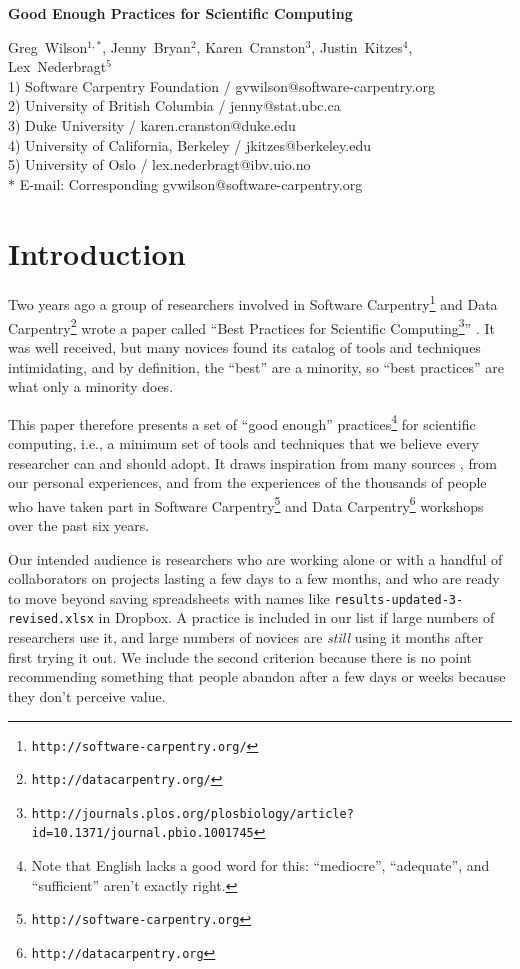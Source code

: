 \documentclass[10pt]{article}
\date{}
\newcommand{\withurl}[2]{{#1}\footnote{\texttt{#2}}}
\begin{document}
\begin{flushleft}
{\Large
\textbf{Good Enough Practices for Scientific Computing}
}

{Greg~Wilson}$^{1,\ast}$,
{Jenny~Bryan}$^{2}$,
{Karen~Cranston}$^{3}$,
{Justin~Kitzes}$^{4}$,
{Lex~Nederbragt}$^{5}$
\\
1) Software Carpentry Foundation / gvwilson@software-carpentry.org
\\
2) University of British Columbia / jenny@stat.ubc.ca
\\
3) Duke University / karen.cranston@duke.edu
\\
4) University of California, Berkeley / jkitzes@berkeley.edu
\\
5) University of Oslo / lex.nederbragt@ibv.uio.no
\\
$\ast$ E-mail: Corresponding gvwilson@software-carpentry.org
\end{flushleft}

\section{Introduction}\label{sec:introduction}

Two years ago a group of researchers involved in \withurl{Software
  Carpentry}{http://software-carpentry.org/} and \withurl{Data
  Carpentry}{http://datacarpentry.org/} wrote a paper called
``\withurl{Best Practices for Scientific
  Computing}{http://journals.plos.org/plosbiology/article?id=10.1371/journal.pbio.1001745}''
\cite{wilson2014}. It was well received,
but many novices found its catalog of tools and
techniques intimidating, and by definition, the ``best'' are a
minority, so ``best practices'' are what only a minority does.

This paper therefore presents a set of ``good enough''
practices\footnote{Note that English lacks a good word for this:
  ``mediocre'', ``adequate'', and ``sufficient'' aren't exactly
  right.} for scientific computing, i.e., a minimum set of tools and techniques that we believe every
researcher can and should adopt. It draws inspiration from many
sources \cite{gentzkow2014,noble2009,brown2015,wickham2014,kitzes2016,sandve2013,hart2015},
from our personal experiences,
and from the experiences of the thousands of people who have taken part
in \withurl{Software Carpentry}{http://software-carpentry.org}
and \withurl{Data Carpentry}{http://datacarpentry.org} workshops over the past six years.

Our intended audience is researchers who are working alone or with a
handful of collaborators on projects lasting a few days to a few
months, and who are ready to move beyond saving spreadsheets
with names like \texttt{results-updated-3-revised.xlsx} in Dropbox. A practice
is included in our list if large numbers of researchers use it, and large numbers
of novices are \emph{still} using it
months after first trying it out. We include the second criterion because
there is no point recommending something that people
abandon after a few days or weeks because they don't
perceive value.
\end{document}
